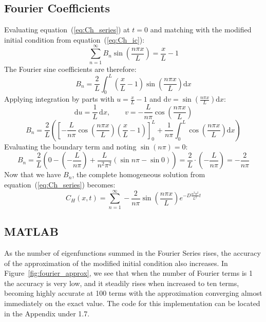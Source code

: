 \documentclass[a4paper,12pt]{article} %
\newcommand{\CH}{C_{H}}
\begin{document}
\subsection{Fourier Coefficients}
Evaluating equation~(\ref{eq:Ch_series}) at $t=0$ and matching with the modified initial condition from equation~(\ref{eq:Ch_ic}):
\begin{equation}
    \label{eq:fourier_match}
    \sum_{n=1}^{\infty} B_{n}\sin\!\left(\frac{n \pi x}{L}\right) = \frac{x}{L}-1
\end{equation}
The Fourier sine coefficients are therefore:
\begin{equation}
    \label{eq:Bn_integral}
    B_{n} = \frac{2}{L}\int^L_0 \left(\frac{x}{L}-1\right)\sin\!\left(\frac{n \pi x}{L}\right)\mathrm{d}x
\end{equation}
Applying integration by parts with $u = \frac{x}{L} - 1$ and $\mathrm{d}v = \sin\!\left(\frac{n \pi x}{L}\right)\mathrm{d}x$:
\begin{equation}
    \label{eq:ibp_parts}
    \mathrm{d}u = \frac{1}{L}\,\mathrm{d}x, \qquad v = -\frac{L}{n \pi}\cos\!\left(\frac{n \pi x}{L}\right)
\end{equation}
\begin{equation}
    \label{eq:Bn_ibp}
    B_{n} = \frac{2}{L}\left(\left[-\frac{L}{n \pi}\cos\!\left(\frac{n \pi x}{L}\right)\left(\frac{x}{L}-1\right)\right]_0^L + \frac{1}{n \pi}\int_0^L\cos\!\left(\frac{n \pi x}{L}\right)\mathrm{d}x\right)
\end{equation}
Evaluating the boundary term and noting $\sin(n\pi) = 0$:
\begin{equation}
    \label{eq:Bn_eval}
    B_{n} = \frac{2}{L}\left(0 - \left(-\frac{L}{n \pi}\right) + \frac{L}{n^2 \pi^2}\left(\sin{n \pi} - \sin{0}\right)\right)
    = \frac{2}{L}\cdot\left(-\frac{L}{n \pi}\right) = -\frac{2}{n \pi}
\end{equation}
Now that we have $B_{n}$, the complete homogeneous solution from equation~(\ref{eq:Ch_series}) becomes:
\begin{equation}
    \label{eq:Ch_final}
    \CH(x,t) = \sum_{n=1}^{\infty} -\frac{2}{n \pi}\sin\!\left(\frac{n \pi x}{L}\right)e^{-D \frac{n^2\pi^2}{L^2} t}
\end{equation}

\subsection{MATLAB}
As the number of eigenfunctions summed in the Fourier Series rises, the accuracy of the approximation of the modified initial condition also increases. In Figure~\ref{fig:fourier_approx}, we see that when the number of Fourier terms is 1 the accuracy is very low, and it steadily rises when increased to ten terms, becoming highly accurate at 100 terms with the approximation converging almost immediately on the exact value. The code for this implementation can be located in the Appendix under 1.7.
\end{document}
